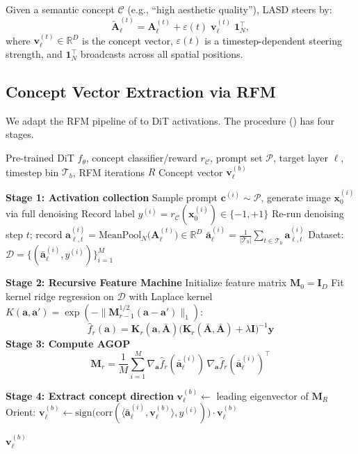 \documentclass[11pt]{article}
\newcommand{\R}{\mathbb{R}}
\newcommand{\bx}{\mathbf{x}}
\newcommand{\ba}{\mathbf{a}}
\newcommand{\bv}{\mathbf{v}}
\newcommand{\bA}{\mathbf{A}}
\newcommand{\bM}{\mathbf{M}}
\newcommand{\bc}{\mathbf{c}}
\begin{document}
Given a semantic concept $\mathcal{C}$ (e.g., ``high aesthetic quality''), LASD steers by:
\begin{equation}
    \tilde{\bA}_\ell^{(t)} = \bA_\ell^{(t)} + \varepsilon(t)\; \bv_\ell^{(t)}\; \mathbf{1}_N^\top,
    \label{eq:lasd}
\end{equation}
where $\bv_\ell^{(t)} \in \R^D$ is the concept vector, $\varepsilon(t)$ is a timestep-dependent steering strength, and $\mathbf{1}_N^\top$ broadcasts across all spatial positions.

\subsection{Concept Vector Extraction via RFM}
\label{sec:extraction}

We adapt the RFM pipeline of \citet{radhakrishnan2024mechanism,beaglehole2026universal} to DiT activations.
The procedure () has four stages.

\begin{algorithm}[h]
\caption{LASD Concept Vector Extraction}
\label{alg:extraction}
\begin{algorithmic}[1]
\REQUIRE Pre-trained DiT $f_\theta$, concept classifier/reward $r_\mathcal{C}$, prompt set $\mathcal{P}$, target layer $\ell$, timestep bin $\mathcal{T}_b$, RFM iterations $R$
\ENSURE Concept vector $\bv_\ell^{(b)}$

\STATE \textbf{Stage 1: Activation collection}
    \STATE Sample prompt $\bc^{(i)} \sim \mathcal{P}$, generate image $\bx_0^{(i)}$ via full denoising
    \STATE Record label $y^{(i)} = r_\mathcal{C}(\bx_0^{(i)}) \in \{-1, +1\}$
        \STATE Re-run denoising step $t$; record $\ba_{\ell,t}^{(i)} = \mathrm{MeanPool}_N\bigl(\bA_\ell^{(t)}\bigr) \in \R^D$
    \ENDFOR
    \STATE $\bar{\ba}_\ell^{(i)} = \frac{1}{|\mathcal{T}_b|}\sum_{t \in \mathcal{T}_b} \ba_{\ell,t}^{(i)}$ \hfill {}
\ENDFOR
\STATE Dataset: $\mathcal{D} = \{(\bar{\ba}_\ell^{(i)}, y^{(i)})\}_{i=1}^M$

\STATE \textbf{Stage 2: Recursive Feature Machine}
\STATE Initialize feature matrix $\bM_0 = \mathbf{I}_D$
    \STATE Fit kernel ridge regression on $\mathcal{D}$ with Laplace kernel $K(\ba, \ba') = \exp(-\|\bM_{r-1}^{1/2}(\ba - \ba')\|_1)$:
    \[
        \hat{f}_r(\ba) = \mathbf{K}_r(\ba, \bar{\bA})\bigl(\mathbf{K}_r(\bar{\bA}, \bar{\bA}) + \lambda \mathbf{I}\bigr)^{-1} \mathbf{y}
    \]
    \STATE \textbf{Stage 3: Compute AGOP}
    \[
        \bM_r = \frac{1}{M}\sum_{i=1}^{M} \nabla_{\ba} \hat{f}_r(\bar{\ba}_\ell^{(i)})\, \nabla_{\ba} \hat{f}_r(\bar{\ba}_\ell^{(i)})^\top
    \]
\ENDFOR

\STATE \textbf{Stage 4: Extract concept direction}
\STATE $\bv_\ell^{(b)} \leftarrow$ leading eigenvector of $\bM_R$
\STATE Orient: $\bv_\ell^{(b)} \leftarrow \mathrm{sign}\bigl(\mathrm{corr}(\langle \bar{\ba}_\ell^{(i)}, \bv_\ell^{(b)} \rangle, y^{(i)})\bigr) \cdot \bv_\ell^{(b)}$

\RETURN $\bv_\ell^{(b)}$
\end{algorithmic}
\end{algorithm}
\end{document}

